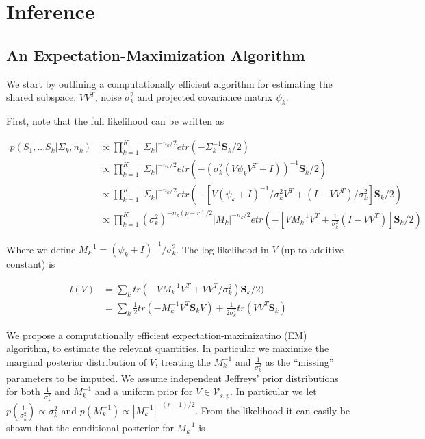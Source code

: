 \documentclass{article}
\begin{document}
\section{Inference}
\subsection{An Expectation-Maximization Algorithm}
\label{sec:em}

We start by outlining a computationally efficient algorithm for
estimating the shared subspace, $VV^T$, noise $\sigma_k^2$ and
projected covariance matrix $\psi_k$.    

First, note that the full likelihood can be written as

\begin{align}
p(S_1, ... S_k | \Sigma_k,n_k) &\propto \prod_{k=1}^K |\Sigma_k|^{-n_k/2}etr(-\Sigma_k^{-1}\mathbf{S}_k/2)  \\
&\propto \prod_{k=1}^K  |\Sigma_k|^{-n_k/2}etr(-(\sigma_k^2(V\psi_kV^T +
  I))^{-1}\mathbf{S}_k/2) \\
&\propto \prod_{k=1}^K  |\Sigma_k|^{-n_k/2}etr(-\left[V(\psi_k +
  I)^{-1}/\sigma_k^2 V^T + (I-VV^T)/\sigma^2_k\right]\mathbf{S}_k/2)
  \\
&\propto \prod_{k=1}^K  (\sigma_k^2)^{-n_k(p-r)/2}|M_k|^{-n_k/2}etr(-\left[VM_k^{-1}V^T + \frac{1}{\sigma^2_k} (I-VV^T)\right]\mathbf{S}_k/2) 
\end{align}

Where we define $M_k^{-1} = (\psi_k + I) ^{-1}/\sigma_k^2$.  The log-likelihood in
$V$ (up to additive constant) is

\begin{align}
l(V) &= \sum_k tr\left(-VM_k^{-1}V^T +
       VV^T/\sigma^2_k\right)\mathbf{S}_k/2)\\
&= \sum_k \frac{1}{2}tr\left(-M_k^{-1}V^T \mathbf{S}_kV\right) + \frac{1}{2\sigma_k^2}tr\left(VV^T \mathbf{S}_k\right)
\end{align}


We propose a computationally efficient expectation-maximizatino (EM)
algorithm, to estimate the relevant quantities.  In particular we
maximize the marginal posterior distribution of $V$, treating the
$M_k^{-1}$ and $\frac{1}{\sigma_k^2}$ as the ``missing'' parameters to
be imputed.  We assume independent Jeffreys' prior distributions for
both $\frac{1}{\sigma_k^2}$ and $M_k^{-1}$ and a uniform prior for $V
\in \mathcal{V}_{s, p}$.  In particular we let
$p(\frac{1}{\sigma_k^2}) \propto \sigma_k^2$ and
$p(M_k^{-1}) \propto |M_k^{-1}|^{-(r+1)/2}$.  From the likelihood it
can easily be shown that the conditional posterior for $M_k^{-1}$ is
\end{document}
